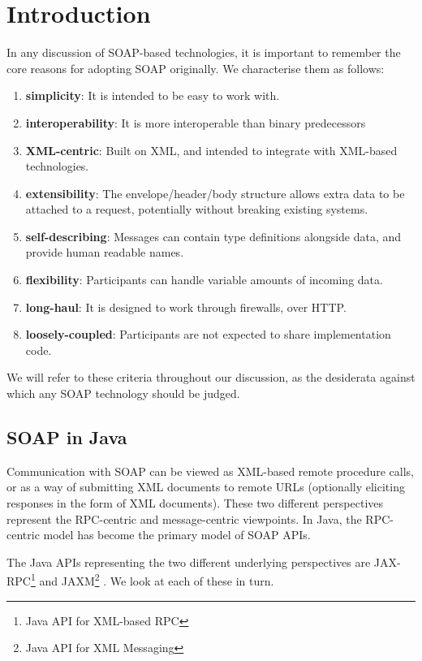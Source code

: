 \section{Introduction}
\label{introduction}

In any discussion of SOAP-based technologies, it is important to
remember the core reasons for adopting SOAP originally. We
characterise them as follows:

\begin{enumerate}
\item \textbf{simplicity}: It is intended to be easy to work with.
\item \textbf{interoperability}: It is more interoperable than binary predecessors
\item \textbf{XML-centric}: Built on XML, and intended to integrate
with XML-based technologies.
\item \textbf{extensibility}: The envelope/header/body structure allows extra data to be attached to a
request, potentially without breaking existing systems.
\item \textbf{self-describing}: Messages can contain type definitions alongside
data, and provide human readable names.
\item \textbf{flexibility}: Participants can handle variable amounts of
incoming data.
\item \textbf{long-haul}: It is designed to work through firewalls, over HTTP.
\item \textbf{loosely-coupled}: Participants are not expected to share
implementation code.
\end{enumerate}

We will refer to these criteria throughout our discussion, as the
desiderata against which any SOAP technology should be judged.

\subsection{SOAP in Java}
\label{intro:java}

Communication with SOAP can be viewed as XML-based remote procedure
calls, or as a way of submitting XML documents to remote URLs
(optionally eliciting responses in the form of XML documents). These
two different perspectives represent the RPC-centric and
message-centric viewpoints. In Java, the RPC-centric model has become
the primary model of SOAP APIs.

The Java APIs representing the two different underlying perspectives
are JAX-RPC\footnote{Java API for XML-based RPC}
\cite{spec:JAX-RPC-11} and JAXM\footnote{Java API for XML Messaging}
\cite{spec:JAX-M-11}. We look at each of these in turn.

